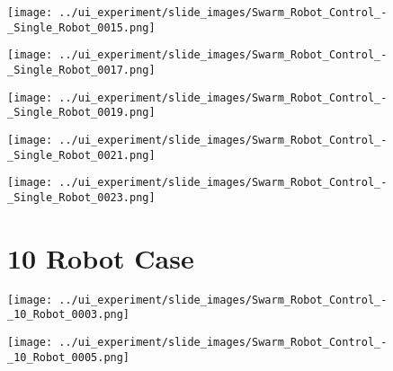 \begin{minipage}{\linewidth}
	\centering
	\begin{minipage}{0.42\linewidth}
		\texttt{[image: ../ui\_experiment/slide\_images/Swarm\_Robot\_Control\_-\_Single\_Robot\_0015.png]}
		\label{fig:sub1}
	\end{minipage}
	\hspace{0.05\linewidth}
	\begin{minipage}{0.42\linewidth}
		\texttt{[image: ../ui\_experiment/slide\_images/Swarm\_Robot\_Control\_-\_Single\_Robot\_0017.png]}
		\label{fig:sub2}
	\end{minipage}
	\label{fig:single_robot_slides}
\end{minipage}


\begin{minipage}{\linewidth}
	\centering
	\begin{minipage}{0.42\linewidth}
		\texttt{[image: ../ui\_experiment/slide\_images/Swarm\_Robot\_Control\_-\_Single\_Robot\_0019.png]}
		\label{fig:sub1}
	\end{minipage}
	\hspace{0.05\linewidth}
	\begin{minipage}{0.42\linewidth}
		\texttt{[image: ../ui\_experiment/slide\_images/Swarm\_Robot\_Control\_-\_Single\_Robot\_0021.png]}
		\label{fig:sub2}
	\end{minipage}
\end{minipage}

\begin{minipage}{\linewidth}
	\centering
	\begin{minipage}{0.42\linewidth}
		\texttt{[image: ../ui\_experiment/slide\_images/Swarm\_Robot\_Control\_-\_Single\_Robot\_0023.png]}
		\label{fig:sub1}
	\end{minipage}
	\label{fig:single_robot_slides_pt2}
\end{minipage}


\section{10 Robot Case}

\begin{minipage}{\linewidth}
	\centering
	\begin{minipage}{0.42\linewidth}
		\texttt{[image: ../ui\_experiment/slide\_images/Swarm\_Robot\_Control\_-\_10\_Robot\_0003.png]}
		\label{fig:sub1}
	\end{minipage}
	\hspace{0.05\linewidth}
	\begin{minipage}{0.42\linewidth}
		\texttt{[image: ../ui\_experiment/slide\_images/Swarm\_Robot\_Control\_-\_10\_Robot\_0005.png]}
		\label{fig:sub2}
	\end{minipage}
\end{minipage}

